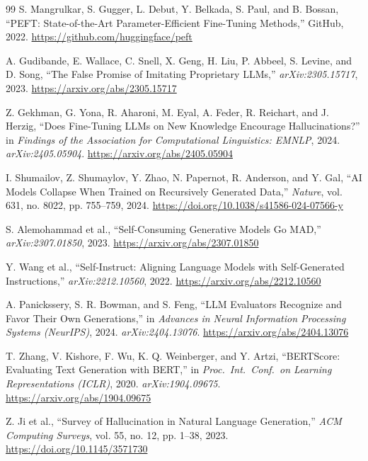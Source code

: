 \documentclass[11pt, a4paper]{article}
\begin{document}
\begin{thebibliography}{99}
S. Mangrulkar, S. Gugger, L. Debut, Y. Belkada, S. Paul, and B. Bossan, ``PEFT: State-of-the-Art Parameter-Efficient Fine-Tuning Methods,'' GitHub, 2022. \url{https://github.com/huggingface/peft}

A. Gudibande, E. Wallace, C. Snell, X. Geng, H. Liu, P. Abbeel, S. Levine, and D. Song, ``The False Promise of Imitating Proprietary LLMs,'' \textit{arXiv:2305.15717}, 2023. \url{https://arxiv.org/abs/2305.15717}

Z. Gekhman, G. Yona, R. Aharoni, M. Eyal, A. Feder, R. Reichart, and J. Herzig, ``Does Fine-Tuning LLMs on New Knowledge Encourage Hallucinations?'' in \textit{Findings of the Association for Computational Linguistics: EMNLP}, 2024. \textit{arXiv:2405.05904}. \url{https://arxiv.org/abs/2405.05904}

I. Shumailov, Z. Shumaylov, Y. Zhao, N. Papernot, R. Anderson, and Y. Gal, ``AI Models Collapse When Trained on Recursively Generated Data,'' \textit{Nature}, vol. 631, no. 8022, pp. 755--759, 2024. \url{https://doi.org/10.1038/s41586-024-07566-y}

S. Alemohammad et al., ``Self-Consuming Generative Models Go MAD,'' \textit{arXiv:2307.01850}, 2023. \url{https://arxiv.org/abs/2307.01850}

Y. Wang et al., ``Self-Instruct: Aligning Language Models with Self-Generated Instructions,'' \textit{arXiv:2212.10560}, 2022. \url{https://arxiv.org/abs/2212.10560}

A. Panickssery, S. R. Bowman, and S. Feng, ``LLM Evaluators Recognize and Favor Their Own Generations,'' in \textit{Advances in Neural Information Processing Systems (NeurIPS)}, 2024. \textit{arXiv:2404.13076}. \url{https://arxiv.org/abs/2404.13076}

T. Zhang, V. Kishore, F. Wu, K. Q. Weinberger, and Y. Artzi, ``BERTScore: Evaluating Text Generation with BERT,'' in \textit{Proc.\ Int.\ Conf.\ on Learning Representations (ICLR)}, 2020. \textit{arXiv:1904.09675}. \url{https://arxiv.org/abs/1904.09675}

Z. Ji et al., ``Survey of Hallucination in Natural Language Generation,'' \textit{ACM Computing Surveys}, vol. 55, no. 12, pp. 1--38, 2023. \url{https://doi.org/10.1145/3571730}

\end{thebibliography}
\end{document}
